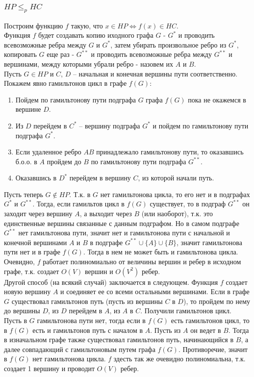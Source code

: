 \documentclass{article}
\begin{document}
\subsubsection*{$HP \leqslant_p HC$}
Построим функцию $f$ такую, что $ x \in HP \iff f(x) \in HC $.\\
Функция $f$ будет создавать копию иходного графа $G$ - $G^*$ и проводить всевозможные ребра между $G$ и $G^*$, затем убирать произвольное ребро из $G^*$, копировать $G$ еще раз - $G^{**}$ и проводить всевозможные ребра  между $G^{**}$ и вершинами, между которыми убрали ребро - назовем их $A$ и $B$.\\
Пусть $G \in HP$ и $C$, $D$ -- начальная и конечная вершины пути соответственно. Покажем явно гамильтонов цикл в графе $f(G)$:
\begin{enumerate}
\item Пойдем по гамильтонову пути подграфа $G$ графа $f(G)$ пока не окажемся в вершине $D$.
\item Из $D$ перейдем в $C^*$ -- вершину подграфа $G^*$ и пойдем по гамильтонову пути подграфа $G^*$.
\item Если удаленное ребро $AB$ принадлежало гамильтонову пути, то оказавшись б.о.о. в $A$ пройдем до $B$ по гамильтонову пути подграфа $G^{**}$.
\item Оказавшись в $D^*$ перейдем в вершину $C$, из которой начали путь. 
\end{enumerate} 
Пусть теперь  $G \notin HP$. Т.к. в $G$ нет гамильтонова цикла, то его нет и в подграфах $G^*$ и $G^{**}$. Тогда, если гамильтов цикл в $f(G)$ существует, то в подграф $G^{**}$ он заходит через вершину $A$, а выходит через $B$ (или наоборот), т.к. это единственные вершины связанные с данным подграфом. Но в самом подграфе $G^{**}$ нет гамильтонова пути, значит нет и гамильтонова пути с начальной и конечной вершинами $A$ и $B$ в подграфе $G^{**} \cup \{A\} \cup \{B\}$, значит гамильтонова пути нет и в графе $f(G)$. Тогда в нем не может быть и гамильтонова цикла. \\
Очевидно, $f$ работает полиномиально от величины вершин и ребер в исходном графе, т.к. создает $O(V)$ вершин и $O(V^2)$ ребер.\\
Другой способ (на всякий случай) заключается в следующем. Функция $f$ создает новую вершину $A$ и соединяет ее со всеми остальными вершинами. Если в графе $G$ существовал гамильтонов путь (пусть из вершины $C$ в $D$), то пройдем по нему до вершины $D$, из $D$ перейдем в $A$, из $A$ в $C$. Получили гамильтонов цикл. Пусть в $G$ гамильтонова пути нет, тогда если в $f(G)$ есть гамильтонов цикл, то в $f(G)$ есть и гамильтонов путь с началом в $A$. Пусть из $A$ он ведет в $B$. Тогда в изначальном графе также существовал гамильтонов путь, начинающийся в $B$, а далее совпадающий с гамильтоновым путем графа $f(G)$. Противоречие, значит в $f(G)$ нет гамильтонова цикла. $f$ здесть так же очевидно полиномиальна, т.к. создает 1 вершину и проводит $O(V)$ ребер.
\end{document}
